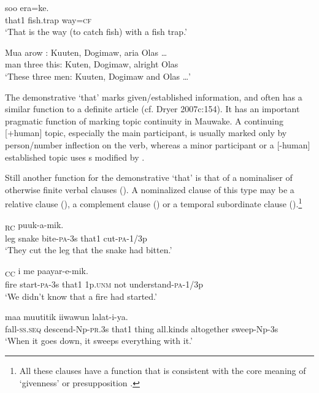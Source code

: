 \ea%
\label{ex:3:x639}
\gll {} soo era=ke. \\
that1 fish.trap way=\textsc{cf}\\
\glt`That is the way (to catch fish) with a fish trap.'
\z

\ea%
\label{ex:3:x640}
\gll Mua arow : Kuuten, Dogimaw, aria Olas {\dots} \\
man three this: Kuten, Dogimaw, alright Olas\\
\glt`These three men: Kuuten, Dogimaw and Olas {\dots}'
\z

The demonstrative  `that' marks given/established information, and often has a similar function to a definite article (cf. Dryer 2007c:154). It has an important pragmatic function of marking topic continuity in Mauwake. A continuing [+human] topic, especially the main participant, is usually marked only by person/number inflection on the verb, whereas a minor participant or a [-human] established topic uses s modified by .

Still another function for the demonstrative  `that' is that of a nominaliser of otherwise finite verbal clauses (). A nominalized clause of this type may be a relative clause  (), a complement clause  () or a temporal subordinate clause  ().\footnote{All these clauses have a function that is consistent with the core meaning of `givenness' \citep{Haiman1978} or presupposition \citep{Reesink1987}.}

\ea%
\label{ex:3:x687}
\textsubscript{RC} puuk-a-mik. \\
leg snake bite-\textsc{pa}-3s that1 cut-\textsc{pa}-1/3p\\
\glt`They cut the leg that the snake had bitten.'
\z

\ea%
\label{ex:3:x689}
\textsubscript{CC} i me paayar-e-mik. \\
fire start-\textsc{pa}-3s that1 1p.\textsc{unm} not understand-\textsc{pa}-1/3p\\
\glt`We didn't know that a fire had started.'
\z

\ea%
\label{ex:3:x688}
 maa muutitik iiwawun lalat-i-ya.\\
fall-\textsc{ss}.\textsc{seq} descend-Np-\textsc{pr}.3s that1 thing all.kinds altogether sweep-Np-3s\\
\glt`When it goes down, it sweeps everything with it.'
\z

